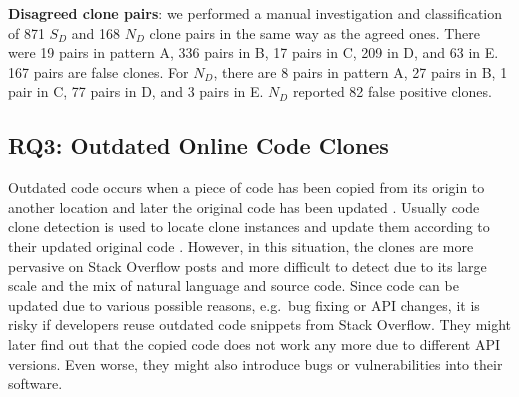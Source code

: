 \documentclass{sig-alternate-05-2015}
\begin{document}
\textbf{Disagreed clone pairs}: we performed a manual investigation and classification of 871 $S_D$ and 168 $N_D$ clone pairs in the same way as the agreed ones. There were 19 pairs in pattern A, 336 pairs in B, 17 pairs in C, 209 in D, and 63 in E. 167 pairs are false clones. For $N_D$, there are 8 pairs in pattern A, 27 pairs in B, 1 pair in C, 77 pairs in D, and 3 pairs in E. $N_D$ reported 82 false positive clones.


\subsection{RQ3: Outdated Online Code Clones}


Outdated code occurs when a piece of code has been copied from its origin to another location and later the original code has been updated \cite{Xia2014}. Usually code clone detection is used to locate clone instances and update them according to their updated original code \cite{Bellon2007}. However, in this situation, the clones are more pervasive on Stack Overflow posts and more difficult to detect due to its large scale and the mix of natural language and source code. Since code can be updated due to various possible reasons, e.g.~bug fixing or API changes, it is risky if developers reuse outdated code snippets from Stack Overflow. %
They might later find out that the copied code does not work any more due to different API versions. Even worse, they might also introduce bugs or vulnerabilities into their software. 
\end{document}
